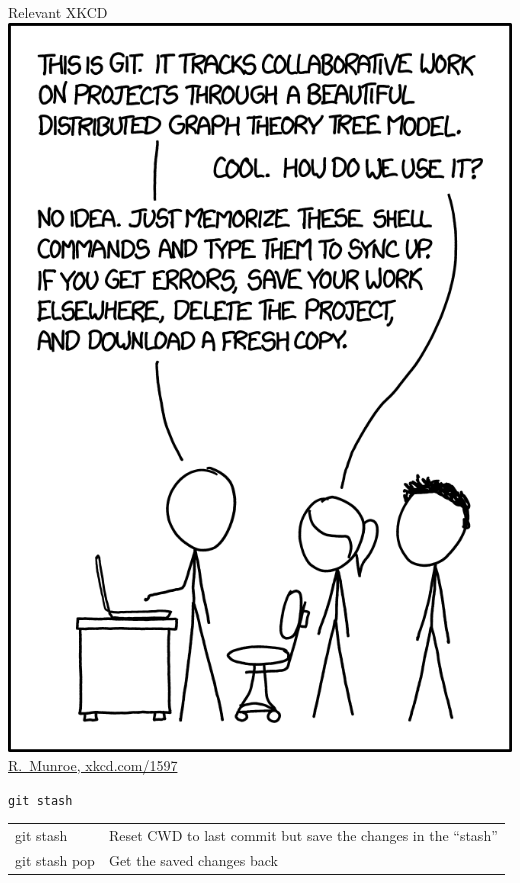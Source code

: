 \begin{frame}[t]{Relevant XKCD}%
  \centering%
  \includegraphics[height=0.95\textheight]{images/xkcd.png}%
  \href{https://xkcd.com/1597}{R.~Munroe, xkcd.com/1597}%
\end{frame}

\begin{frame}{\texttt{git stash}}
  \begin{tabu}{>{\ttfamily}l X[,L]}
    git stash     & Reset CWD to last commit but save the changes in the \enquote{stash} \\
    git stash pop & Get the saved changes back
  \end{tabu}
\end{frame}

